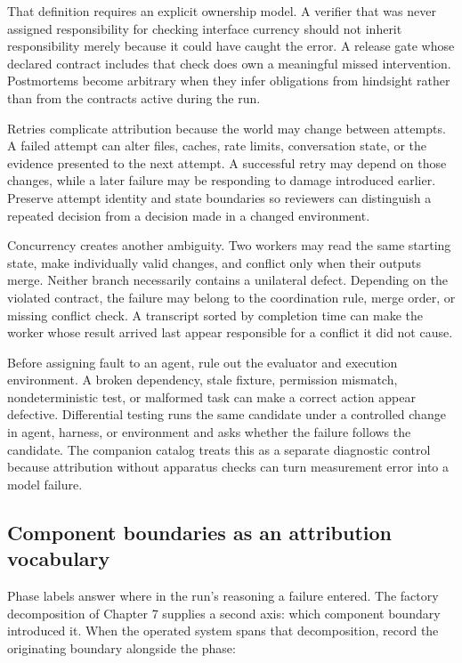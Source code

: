 That definition requires an explicit ownership model. A verifier that was never assigned responsibility for checking interface currency should not inherit responsibility merely because it could have caught the error. A release gate whose declared contract includes that check does own a meaningful missed intervention. Postmortems become arbitrary when they infer obligations from hindsight rather than from the contracts active during the run.

Retries complicate attribution because the world may change between attempts. A failed attempt can alter files, caches, rate limits, conversation state, or the evidence presented to the next attempt. A successful retry may depend on those changes, while a later failure may be responding to damage introduced earlier. Preserve attempt identity and state boundaries so reviewers can distinguish a repeated decision from a decision made in a changed environment.

Concurrency creates another ambiguity. Two workers may read the same starting state, make individually valid changes, and conflict only when their outputs merge. Neither branch necessarily contains a unilateral defect. Depending on the violated contract, the failure may belong to the coordination rule, merge order, or missing conflict check. A transcript sorted by completion time can make the worker whose result arrived last appear responsible for a conflict it did not cause.

Before assigning fault to an agent, rule out the evaluator and execution environment. A broken dependency, stale fixture, permission mismatch, nondeterministic test, or malformed task can make a correct action appear defective. Differential testing runs the same candidate under a controlled change in agent, harness, or environment and asks whether the failure follows the candidate. The companion catalog treats this as a separate diagnostic control because attribution without apparatus checks can turn measurement error into a model failure.

\hypertarget{component-boundaries-as-attribution-vocabulary}{%
\subsection{Component boundaries as an attribution vocabulary}\label{component-boundaries-as-attribution-vocabulary}}

Phase labels answer where in the run's reasoning a failure entered. The factory decomposition of Chapter 7 supplies a second axis: which component boundary introduced it. When the operated system spans that decomposition, record the originating boundary alongside the phase:

